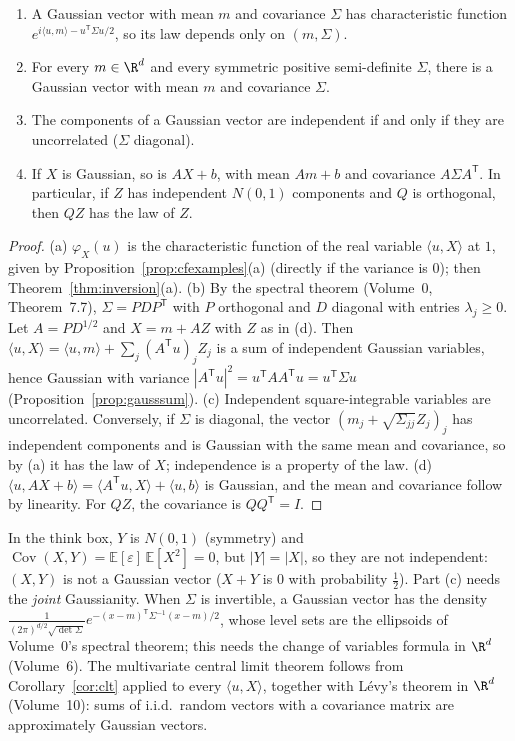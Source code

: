 \begin{theorem}\label{thm:gaussvec}
\begin{enumerate}[label=(\alph*)]
\item A Gaussian vector with mean $m$ and covariance $\Sigma$ has characteristic function $e^{i\langle u,m\rangle-u^{\mathsf T}\Sigma u/2}$, so its law depends only on
$(m,\Sigma)$.
\item For every $m\in\R^d$ and every symmetric positive semi-definite $\Sigma$, there is a Gaussian vector with mean $m$ and covariance $\Sigma$.
\item The components of a Gaussian vector are independent if and only if they are uncorrelated ($\Sigma$ diagonal).
\item If $X$ is Gaussian, so is $AX+b$, with mean $Am+b$ and covariance $A\Sigma A^{\mathsf T}$. In particular, if $Z$ has independent $N(0,1)$
components and $Q$ is orthogonal, then $QZ$ has the law of $Z$.
\end{enumerate}
\end{theorem}
\begin{proof}
(a) $\varphi_X(u)$ is the characteristic function of the real variable $\langle u,X\rangle$ at $1$, given by Proposition~\ref{prop:cfexamples}(a) (directly if the
variance is $0$); then Theorem~\ref{thm:inversion}(a).
(b) By the spectral theorem (Volume~0, Theorem~7.7), $\Sigma=PDP^{\mathsf T}$ with $P$ orthogonal and $D$ diagonal with entries $\lambda_j\ge0$. Let $A=PD^{1/2}$ and
$X=m+AZ$ with $Z$ as in (d). Then $\langle u,X\rangle=\langle u,m\rangle+\sum_j(A^{\mathsf T}u)_jZ_j$ is a sum of independent Gaussian variables, hence Gaussian with
variance $|A^{\mathsf T}u|^2=u^{\mathsf T}AA^{\mathsf T}u=u^{\mathsf T}\Sigma u$ (Proposition~\ref{prop:gausssum}).
(c) Independent square-integrable variables are uncorrelated. Conversely, if $\Sigma$ is diagonal, the vector $(m_j+\sqrt{\Sigma_{jj}}Z_j)_j$ has independent
components and is Gaussian with the same mean and covariance, so by (a) it has the law of $X$; independence is a property
of the law.
(d) $\langle u,AX+b\rangle=\langle A^{\mathsf T}u,X\rangle+\langle u,b\rangle$ is Gaussian, and the mean and covariance follow by linearity. For $QZ$, the covariance is $QQ^{\mathsf T}=I$.
\end{proof}

In the think box, $Y$ is $N(0,1)$ (symmetry) and $\operatorname{Cov}(X,Y)=\mathbb E[\varepsilon]\,\mathbb E[X^2]=0$, but $|Y|=|X|$, so they are not independent: $(X,Y)$ is not a
Gaussian vector ($X+Y$ is $0$ with probability $\frac12$). Part (c) needs the \emph{joint} Gaussianity. When $\Sigma$ is invertible, a Gaussian
vector has the density $\frac1{(2\pi)^{d/2}\sqrt{\det\Sigma}}e^{-(x-m)^{\mathsf T}\Sigma^{-1}(x-m)/2}$, whose level sets are the ellipsoids of Volume~0's spectral theorem; this
needs the change of variables formula in $\R^d$ (Volume~6). The multivariate central limit theorem follows from
Corollary~\ref{cor:clt} applied to every $\langle u,X\rangle$, together with Lévy's theorem in $\R^d$ (Volume~10): sums of i.i.d.\ random vectors with a
covariance matrix are approximately Gaussian vectors.

